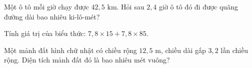 \begin{ex} %
Một ô tô mỗi giờ chạy được $42{,}5\text{ km}$. Hỏi sau $2{,}4$ giờ ô tô đó đi được quãng đường dài bao nhiêu ki-lô-mét?
\end{ex}

\begin{ex} %
Tính giá trị của biểu thức: $7{,}8 \times 15 + 7{,}8 \times 85$.
\end{ex}

\begin{ex} %
Một mảnh đất hình chữ nhật có chiều rộng $12{,}5\text{ m}$, chiều dài gấp $3{,}2$ lần chiều rộng. Diện tích mảnh đất đó là bao nhiêu mét vuông?
\end{ex}
